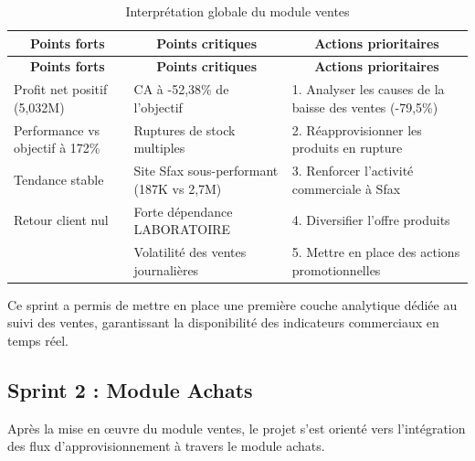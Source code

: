 {\small
\renewcommand{\arraystretch}{1.2}
\setlength{\tabcolsep}{4pt}

\begin{longtable}{|p{5cm}|p{5cm}|p{6.5cm}|}

\caption{Interprétation globale du module ventes} \\

\hline
\multicolumn{1}{|c|}{\textbf{Points forts}} & 
\multicolumn{1}{c|}{\textbf{Points critiques}} & 
\multicolumn{1}{c|}{\textbf{Actions prioritaires}} \\
\hline
\endfirsthead

\hline
\multicolumn{1}{|c|}{\textbf{Points forts}} & 
\multicolumn{1}{c|}{\textbf{Points critiques}} & 
\multicolumn{1}{c|}{\textbf{Actions prioritaires}} \\
\hline
\endhead

\hline
\endfoot

Profit net positif (5,032M) & CA à -52,38\% de l'objectif & 1. Analyser les causes de la baisse des ventes (-79,5\%) \\
\hline

Performance vs objectif à 172\% & Ruptures de stock multiples & 2. Réapprovisionner les produits en rupture \\
\hline

Tendance stable & Site Sfax sous-performant (187K vs 2,7M) & 3. Renforcer l'activité commerciale à Sfax \\
\hline

Retour client nul & Forte dépendance LABORATOIRE & 4. Diversifier l'offre produits \\
\hline

 & Volatilité des ventes journalières & 5. Mettre en place des actions promotionnelles \\
\hline
\end{longtable}

}
Ce sprint a permis de mettre en place une première couche analytique dédiée au suivi des ventes, garantissant la disponibilité des indicateurs commerciaux en temps réel.
\subsection{Sprint 2 : Module Achats}
Après la mise en œuvre du module ventes, le projet s’est orienté vers l’intégration des flux d’approvisionnement à travers le module achats.
